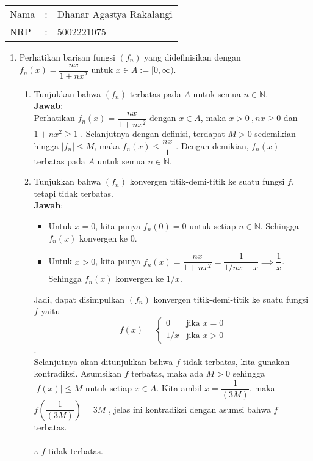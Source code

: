 \documentclass[a4paper, 12pt]{article}
\newcommand{\ans}{\textbf{Jawab}:}
\newcommand{\N}{\mathbb{N}}
\begin{document}
    \begin{tabular}{|lcl|}
     \hline
     Nama&:&Dhanar Agastya Rakalangi\\
     NRP&:&5002221075\\
     \hline
    \end{tabular}

    \begin{enumerate}
        \item Perhatikan barisan fungsi $(f_n)$ yang didefinisikan dengan $f_n(x)=\dfrac{nx}{1+nx^2}$ untuk $x\in A:=[0,\infty)$.
        \begin{enumerate}
            \item Tunjukkan bahwa $(f_n)$ terbatas pada $A$ untuk semua $n\in\N$.\\
            \ans \\
            Perhatikan $f_n(x)=\dfrac{nx}{1+nx^2}$ dengan $x \in A$, maka $x > 0 \ , nx \geq 0$ dan $1+nx^2 \geq 1$ . Selanjutnya dengan definisi, terdapat $M>0$ sedemikian hingga $|f_n| \leq M$, maka $f_n(x) \leq \dfrac{nx}{1}$ .
            Dengan demikian, $f_n(x)$ terbatas pada $A$ untuk semua $n\in\N$.

             \item Tunjukkan bahwa $(f_n)$ konvergen titik-demi-titik ke suatu fungsi $f$, tetapi tidak terbatas.\\
             \ans
            \begin{itemize}
                \item Untuk $x=0$, kita punya $f_n(0)=0$ untuk setiap $n\in\N$. Sehingga $f_n(x)$ konvergen ke $0$.
                \item Untuk $x>0$, kita punya $f_n(x)=\dfrac{nx}{1+nx^2}=\dfrac{1}{1/nx+x}\implies\dfrac{1}{x}$. 
                Sehingga $f_n(x)$ konvergen ke $1/x$.
            \end{itemize}
            Jadi, dapat disimpulkan $(f_n)$ konvergen titik-demi-titik ke suatu fungsi $f$ yaitu 
            $$f(x)=\begin{cases}0&\text{jika }x=0\\1/x&\text{jika }x>0\end{cases}$$.\\
            Selanjutnya akan ditunjukkan bahwa $f$ tidak terbatas, kita gunakan kontradiksi. Asumsikan $f$ terbatas, maka ada $M>0$ sehingga $|f(x)|\leq M$ untuk setiap $x\in A$. Kita ambil $x=\dfrac{1}{(3M)}$, maka $f\left(\dfrac{1}{(3M)}\right)=3M$ , jelas ini kontradiksi dengan asumsi bahwa $f$ terbatas.\\\\
            $\therefore$ $f$ tidak terbatas.\\


\end{enumerate}
\end{enumerate}
\end{document}
